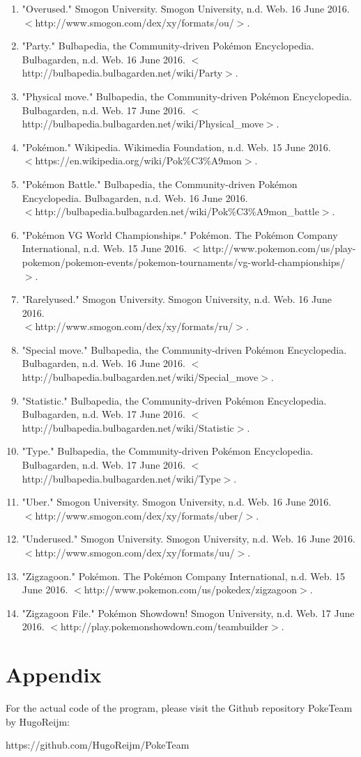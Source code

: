 \documentclass{article}
\begin{document}
\begin{enumerate}
	\item "Overused." Smogon University. Smogon University, n.d. Web. 16 June 2016. \\$<$http://www.smogon.com/dex/xy/formats/ou/$>$.
	\item "Party." Bulbapedia, the Community-driven Pokémon Encyclopedia. Bulbagarden, n.d. Web. 16 June 2016. $<$http://bulbapedia.bulbagarden.net/wiki/Party$>$.  
	\item "Physical move." Bulbapedia, the Community-driven Pokémon Encyclopedia. Bulbagarden, n.d. Web. 17 June 2016. $<$http://bulbapedia.bulbagarden.net/wiki/Physical\_move$>$.
	\item "Pokémon." Wikipedia. Wikimedia Foundation, n.d. Web. 15 June 2016. \\$<$https://en.wikipedia.org/wiki/Pok\%C3\%A9mon$>$. 
	\item "Pokémon Battle." Bulbapedia, the Community-driven Pokémon Encyclopedia. Bulbagarden, n.d. Web. 16 June 2016. \\$<$http://bulbapedia.bulbagarden.net/wiki/Pok\%C3\%A9mon\_battle$>$.  
	\item "Pokémon VG World Championships." Pok\'emon. The Pok\'emon Company International, n.d. Web. 15 June 2016. $<$http://www.pokemon.com/us/play-pokemon/pokemon-events/pokemon-tournaments/vg-world-championships/$>$.
	\item "Rarelyused." Smogon University. Smogon University, n.d. Web. 16 June 2016. \\$<$http://www.smogon.com/dex/xy/formats/ru/$>$.
	\item "Special move." Bulbapedia, the Community-driven Pokémon Encyclopedia. Bulbagarden, n.d. Web. 16 June 2016. $<$http://bulbapedia.bulbagarden.net/wiki/Special\_move$>$.
	\item  "Statistic." Bulbapedia, the Community-driven Pokémon Encyclopedia. Bulbagarden, n.d. Web. 17 June 2016. $<$http://bulbapedia.bulbagarden.net/wiki/Statistic$>$.
	\item "Type." Bulbapedia, the Community-driven Pokémon Encyclopedia. Bulbagarden, n.d. Web. 17 June 2016. $<$http://bulbapedia.bulbagarden.net/wiki/Type$>$.
	\item "Uber." Smogon University. Smogon University, n.d. Web. 16 June 2016. \\$<$http://www.smogon.com/dex/xy/formats/uber/$>$.
	\item "Underused." Smogon University. Smogon University, n.d. Web. 16 June 2016. \\$<$http://www.smogon.com/dex/xy/formats/uu/$>$.
	\item "Zigzagoon." Pok\'emon. The Pok\'emon Company International, n.d. Web. 15 June 2016. $<$http://www.pokemon.com/us/pokedex/zigzagoon$>$.
	\item  "Zigzagoon File." Pok\'emon Showdown! Smogon University, n.d. Web. 17 June 2016. $<$http://play.pokemonshowdown.com/teambuilder$>$.
\end{enumerate}
\section{Appendix}
For the actual code of the program, please visit the Github repository PokeTeam by HugoReijm:\\
\begin{center}
	https://github.com/HugoReijm/PokeTeam
\end{center}
\end{document}
